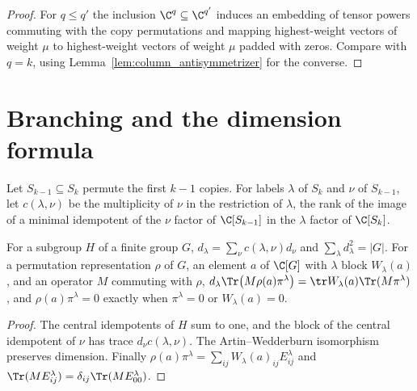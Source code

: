 \begin{proof}\leanok
    For $q\le q'$ the inclusion $\C^q\subseteq\C^{q'}$ induces an embedding of
    tensor powers commuting with the copy permutations and mapping highest-weight
    vectors of weight $\mu$ to highest-weight vectors of weight $\mu$ padded with
    zeros. Compare with $q=k$, using Lemma~\ref{lem:column_antisymmetrizer} for
    the converse.
\end{proof}











\section{Branching and the dimension formula}

Let $S_{k-1}\subseteq S_k$ permute the first $k-1$ copies. For labels $\lambda$ of
$S_k$ and $\nu$ of $S_{k-1}$, let $c(\lambda,\nu)$ be the multiplicity of $\nu$ in
the restriction of $\lambda$, the rank of the image of a minimal idempotent of the
$\nu$ factor of $\C[S_{k-1}]$ in the $\lambda$ factor of $\C[S_k]$.

\begin{lemma}[Restriction]
    \label{lem:restriction}
    \leanok
    For a subgroup $H$ of a finite group $G$, $d_\lambda=\sum_\nu c(\lambda,\nu)d_\nu$
    and $\sum_\lambda d_\lambda^2=|G|$. For a permutation representation $\rho$ of $G$,
    an element $a$ of $\C[G]$ with $\lambda$ block $W_\lambda(a)$, and an operator $M$
    commuting with $\rho$,
    $d_\lambda\Tr\bigl(M\rho(a)\pi^\lambda\bigr)=\tr W_\lambda(a)\Tr(M\pi^\lambda)$,
    and $\rho(a)\pi^\lambda=0$ exactly when $\pi^\lambda=0$ or $W_\lambda(a)=0$.
\end{lemma}

\begin{proof}\leanok
    The central idempotents of $H$ sum to one, and the block of the central
    idempotent of $\nu$ has trace $d_\nu c(\lambda,\nu)$. The Artin--Wedderburn
    isomorphism preserves dimension. Finally
    $\rho(a)\pi^\lambda=\sum_{ij}W_\lambda(a)_{ij}E^\lambda_{ij}$ and
    $\Tr(ME^\lambda_{ij})=\delta_{ij}\Tr(ME^\lambda_{00})$.
\end{proof}


